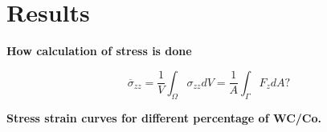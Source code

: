 \documentclass[convergence.tex]{subfiles}
\begin{document}
\chapter{Results}


\textbf{How calculation of stress is done}

\[ \overline{\sigma}_{zz} = \frac{1}{V} \int_\Omega \sigma_{zz} dV = \frac{1}{A} \int_\Gamma F_{z} dA? \]

\textbf{Stress strain curves for different percentage of WC/Co.}
\end{document}
